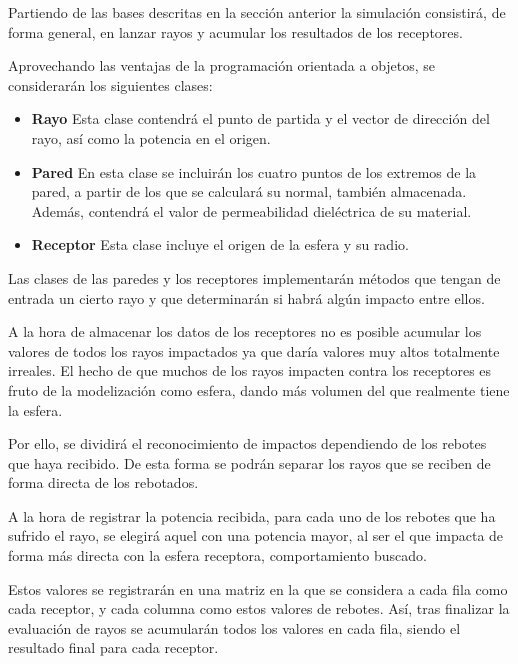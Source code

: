 Partiendo de las bases descritas en la sección anterior la simulación consistirá, de forma general, en lanzar rayos y acumular los resultados de los receptores.

Aprovechando las ventajas de la programación orientada a objetos, se considerarán los siguientes clases:
\begin{itemize}
    \item \textbf{Rayo} Esta clase contendrá el punto de partida y el vector de dirección del rayo, así como la potencia en el origen.
    \item \textbf{Pared} En esta clase se incluirán los cuatro puntos de los extremos de la pared, a partir de los que se calculará su normal, también almacenada. Además, contendrá el valor de permeabilidad dieléctrica de su material.
    \item \textbf{Receptor} Esta clase incluye el origen de la esfera y su radio.
\end{itemize}

Las clases de las paredes y los receptores implementarán métodos que tengan de entrada un cierto rayo y que determinarán si habrá algún impacto entre ellos.

A la hora de almacenar los datos de los receptores no es posible acumular los valores de todos los rayos impactados ya que daría valores muy altos totalmente irreales.
El hecho de que muchos de los rayos impacten contra los receptores es fruto de la modelización como esfera, dando más volumen del que realmente tiene la esfera.

Por ello, se dividirá el reconocimiento de impactos dependiendo de los rebotes que haya recibido.
De esta forma se podrán separar los rayos que se reciben de forma directa de los rebotados.

A la hora de registrar la potencia recibida, para cada uno de los rebotes que ha sufrido el rayo, se elegirá aquel con una potencia mayor, al ser el que impacta de forma más directa con la esfera receptora, comportamiento buscado.

Estos valores se registrarán en una matriz en la que se considera a cada fila como cada receptor, y cada columna como estos valores de rebotes.
Así, tras finalizar la evaluación de rayos se acumularán todos los valores en cada fila, siendo el resultado final para cada receptor.

